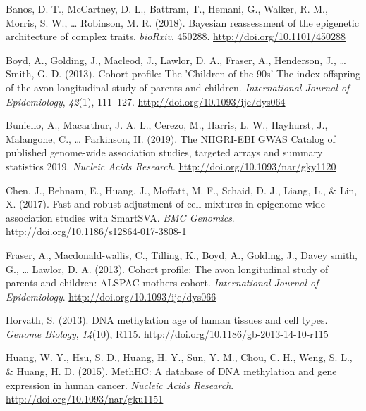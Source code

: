 \documentclass[11pt,twoside]{bristolthesis}
\newlength{\cslhangindent}
\newenvironment{cslreferences}%
  {\setlength{\parindent}{0pt}%
  \everypar{\setlength{\hangindent}{\cslhangindent}}\ignorespaces}%
  {\par}
\begin{document}
\noindent

\setlength{\parindent}{-0.20in}
\setlength{\leftskip}{0.20in}
\setlength{\parskip}{8pt}

\hypertarget{refs}{}
\begin{cslreferences}
\leavevmode\hypertarget{ref-Banos2018}{}%
Banos, D. T., McCartney, D. L., Battram, T., Hemani, G., Walker, R. M., Morris, S. W., \ldots{} Robinson, M. R. (2018). Bayesian reassessment of the epigenetic architecture of complex traits. \emph{bioRxiv}, 450288. \url{http://doi.org/10.1101/450288}

\leavevmode\hypertarget{ref-Boyd2013}{}%
Boyd, A., Golding, J., Macleod, J., Lawlor, D. A., Fraser, A., Henderson, J., \ldots{} Smith, G. D. (2013). Cohort profile: The 'Children of the 90s'-The index offspring of the avon longitudinal study of parents and children. \emph{International Journal of Epidemiology}, \emph{42}(1), 111--127. \url{http://doi.org/10.1093/ije/dys064}

\leavevmode\hypertarget{ref-Buniello2019}{}%
Buniello, A., Macarthur, J. A. L., Cerezo, M., Harris, L. W., Hayhurst, J., Malangone, C., \ldots{} Parkinson, H. (2019). The NHGRI-EBI GWAS Catalog of published genome-wide association studies, targeted arrays and summary statistics 2019. \emph{Nucleic Acids Research}. \url{http://doi.org/10.1093/nar/gky1120}

\leavevmode\hypertarget{ref-Chen2017}{}%
Chen, J., Behnam, E., Huang, J., Moffatt, M. F., Schaid, D. J., Liang, L., \& Lin, X. (2017). Fast and robust adjustment of cell mixtures in epigenome-wide association studies with SmartSVA. \emph{BMC Genomics}. \url{http://doi.org/10.1186/s12864-017-3808-1}

\leavevmode\hypertarget{ref-Fraser2013}{}%
Fraser, A., Macdonald-wallis, C., Tilling, K., Boyd, A., Golding, J., Davey smith, G., \ldots{} Lawlor, D. A. (2013). Cohort profile: The avon longitudinal study of parents and children: ALSPAC mothers cohort. \emph{International Journal of Epidemiology}. \url{http://doi.org/10.1093/ije/dys066}

\leavevmode\hypertarget{ref-Horvath2013}{}%
Horvath, S. (2013). DNA methylation age of human tissues and cell types. \emph{Genome Biology}, \emph{14}(10), R115. \url{http://doi.org/10.1186/gb-2013-14-10-r115}

\leavevmode\hypertarget{ref-Huang2015}{}%
Huang, W. Y., Hsu, S. D., Huang, H. Y., Sun, Y. M., Chou, C. H., Weng, S. L., \& Huang, H. D. (2015). MethHC: A database of DNA methylation and gene expression in human cancer. \emph{Nucleic Acids Research}. \url{http://doi.org/10.1093/nar/gku1151}


\end{cslreferences}
\end{document}
